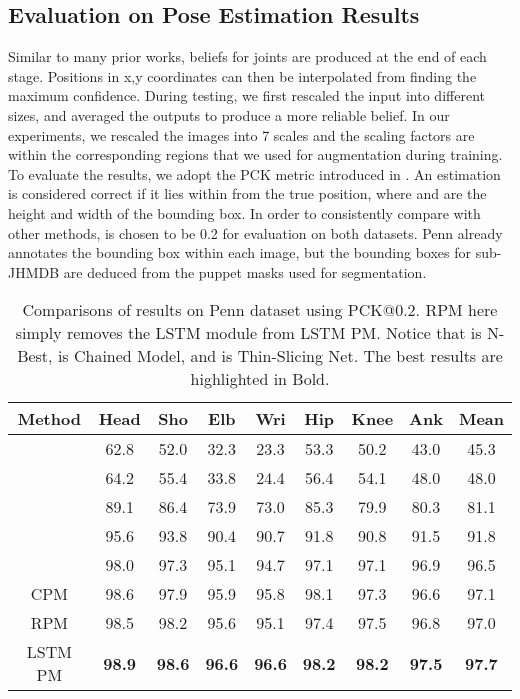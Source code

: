 \documentclass[10pt,twocolumn,letterpaper]{article}
\begin{document}
\subsection{Evaluation on Pose Estimation Results}
Similar to many prior works, beliefs for joints are produced at the end of each stage. Positions in x,y coordinates can then be interpolated from finding the maximum confidence. During testing, we first rescaled the input into different sizes, and averaged the outputs to produce a more reliable belief. In our experiments, we rescaled the images into 7 scales and the scaling factors are within the corresponding regions that we used for augmentation during training. To evaluate the results, we adopt the PCK metric introduced in \cite{yang13mixPCK}. An estimation is considered correct if it lies within  from the true position, where  and  are the height and width of the bounding box. In order to consistently compare with other methods,  is chosen to be 0.2 for evaluation on both datasets. Penn already annotates the bounding box within each image, but the bounding boxes for sub-JHMDB are deduced from the puppet masks used for segmentation.

\renewcommand{\tabcolsep}{2pt}
\begin{table}[!hbp]
  \centering
  \vspace{-2pt}
  \begin{tabular}{c | c c c c c c c | c}
  \toprule
   Method & Head & Sho & Elb & Wri & Hip & Knee & Ank & Mean \\\hline
   \cite{park11videoNB} & 62.8 & 52.0 & 32.3 & 23.3 & 53.3 & 50.2 & 43.0 & 45.3 \\
   \cite{bruce15STjoint} & 64.2 & 55.4 & 33.8 & 24.4 & 56.4 & 54.1 & 48.0 & 48.0 \\
   \cite{iqbal14actpose} & 89.1 & 86.4 & 73.9 & 73.0 & 85.3 & 79.9 & 80.3 & 81.1 \\
   \cite{geor16chain} & 95.6 & 93.8 & 90.4 & 90.7 & 91.8 & 90.8 & 91.5 & 91.8 \\
   \cite{song17flowAdjST} & 98.0 & 97.3 & 95.1 & 94.7 & 97.1 & 97.1 & 96.9 & 96.5 \\
   CPM \cite{wei16refineCPM} & 98.6 & 97.9 & 95.9 & 95.8 & 98.1 & 97.3 & 96.6 & 97.1\\\hline
   RPM & 98.5 & 98.2 & 95.6 & 95.1 & 97.4 & 97.5 & 96.8 & 97.0  \\
   LSTM PM & \textbf{98.9}	& \textbf{98.6} & \textbf{96.6} & \textbf{96.6} & \textbf{98.2} & \textbf{98.2} & \textbf{97.5} & \textbf{97.7} \\
   \bottomrule
  \end{tabular}
  \vspace{2pt}
  \caption{Comparisons of results on Penn dataset using PCK@0.2. RPM here simply removes the LSTM module from LSTM PM. Notice that \cite{park11videoNB} is N-Best, \cite{geor16chain} is Chained Model, and \cite{song17flowAdjST} is Thin-Slicing Net. The best results are highlighted in Bold.}
  \label{Penn}
\end{table}
\end{document}
